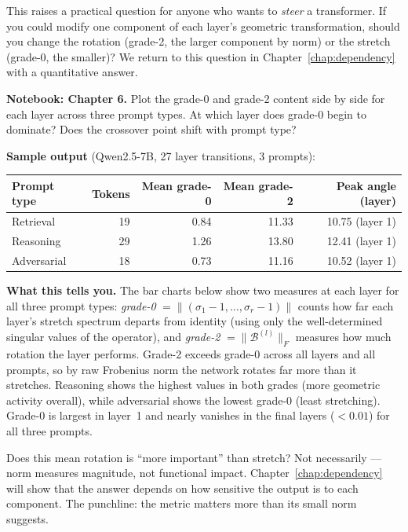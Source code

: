 \documentclass[11pt, twoside, openright]{memoir}
\newcommand{\bivec}[1]{\mathcal{B}^{(#1)}}  %
\numberwithin{equation}{chapter}
\begin{document}
\begin{transformer}
This raises a practical question for anyone who wants to
\emph{steer} a transformer.  If you could modify one component of
each layer's geometric transformation, should you change the
rotation (grade-2, the larger component by norm) or the stretch
(grade-0, the smaller)?  We return to this question in
Chapter~\ref{chap:dependency} with a quantitative answer.
\end{transformer}

\begin{tryit}
\textbf{Notebook: Chapter 6.}  Plot the grade-0 and grade-2 content
side by side for each layer across three prompt types.  At which layer
does grade-0 begin to dominate?  Does the crossover point shift with
prompt type?

\medskip
\textbf{Sample output} (Qwen2.5-7B, 27 layer transitions, 3 prompts):

\begin{center}
\renewcommand{\arraystretch}{1.2}\small
\begin{tabular}{@{} l r r r r @{}}
\toprule
\textbf{Prompt type} & \textbf{Tokens} & \textbf{Mean grade-0} &
  \textbf{Mean grade-2} & \textbf{Peak angle (layer)} \\
\midrule
Retrieval   & 19 & 0.84  & 11.33 & 10.75 (layer 1) \\
Reasoning   & 29 & 1.26  & 13.80 & 12.41 (layer 1) \\
Adversarial & 18 & 0.73  & 11.16 & 10.52 (layer 1) \\
\bottomrule
\end{tabular}
\end{center}

\medskip
\textbf{What this tells you.}
The bar charts below show two measures at each layer for all three
prompt types:
\emph{grade-0} $= \|(\sigma_1 - 1, \ldots, \sigma_r - 1)\|$ counts
how far each layer's stretch spectrum departs from identity
(using only the well-determined singular values of the operator), and
\emph{grade-2} $= \|\bivec{l}\|_F$ measures how much rotation the
layer performs.
Grade-2 exceeds grade-0 across all layers and all prompts,
so by raw Frobenius norm the network rotates far more than it
stretches.  Reasoning shows the highest values in both grades (more
geometric activity overall), while adversarial shows the lowest
grade-0 (least stretching).  Grade-0 is largest in layer~1 and nearly
vanishes in the final layers ($< 0.01$) for all three prompts.

Does this mean rotation is ``more important'' than stretch?
Not necessarily --- norm measures magnitude, not functional impact.
Chapter~\ref{chap:dependency} will show that the answer depends on
how sensitive the output is to each component.  The punchline:
the metric matters more than its small norm suggests.


\end{tryit}
\end{document}
